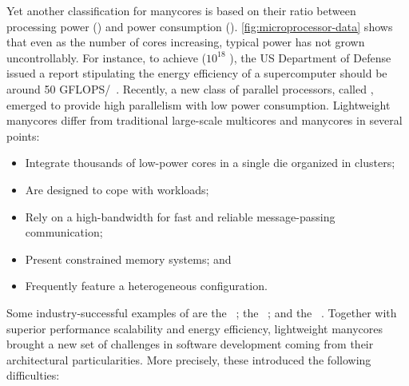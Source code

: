 	Yet another classification for manycores is based on
	their ratio between processing power (\flops) and power consumption
	(\watts). \autoref{fig:microprocessor-data} shows that even as the
	number of cores increasing, typical power has not grown uncontrollably.
	For instance, to achieve \exascale ($10^{18}$ \flops), the US Department
	of Defense issued a report stipulating the energy efficiency of a
	supercomputer should be around 50
	GFLOPS/\watts~\cite{darpa:exascale}. Recently, a new class of
	parallel processors, called \lightweight \manycores, emerged to
	provide high parallelism with low power consumption.
	Lightweight manycores differ from traditional large-scale
	multicores and manycores in several points: 

	\begin{itemize}
		\item Integrate thousands of low-power cores in a single die organized in clusters;
		\item Are designed to cope with \mimd workloads;
		\item Rely on a high-bandwidth \noc for fast and reliable message-passing communication;
		\item Present constrained memory systems; and
		\item Frequently feature a heterogeneous configuration.
	\end{itemize}

	Some industry-successful examples of \lightweight \manycores are the
	\mppa~\cite{DeDinechin2013-1}; the \epiphany~\cite{olofsson2014};
	and the \taihulight~\cite{zheng2015}. Together with superior performance
	scalability and energy efficiency, lightweight manycores brought a new
	set of challenges in software development coming from their
	architectural particularities. More precisely, these 
	introduced the following difficulties:

